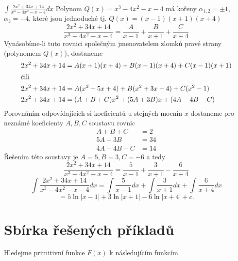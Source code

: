 {      \begin{example}
        $\displaystyle\int{\frac{2x^2+34x+14}{x^3-4x^2-x-4}}dx$ \cite[s.~90]{Knichal}\newline
        Polynom $Q(x)=x^3-4x^2-x-4$ má kořeny $\alpha_{1,2}=\pm1$, $\alpha_{3}=-4$, které jsou
        jednoduché tj. $Q(x)=(x-1)(x+1)(x+4)$ $$\frac{2x^2+34x+14}{x^3-4x^2-x-4} =
        \frac{A}{x-1}+\frac{B}{x+1}+\frac{C}{x+4}$$ Vynásobíme-li tuto rovnici společným
        jmenovatelem zlomků pravé strany (polynomem $Q(x)$), dostaneme
        \footnotesize\begin{align*}
          2x^2+34x+14 &= A(x+1)(x+4)+B(x-1)(x+4)+C(x-1)(x+1) \\
          \shortintertext{čili}
          2x^2+34x+14 &= A(x^2+5x+4)+B(x^2+3x-4)+C(x^2-1) \\
          2x^2+34x+14 &= (A+B+C)x^2+(5A+3B)x + (4A-4B-C)
        \end{align*}\small
        Porovnáním odpovídajících si koeficientů u stejných mocnin $x$  dostaneme pro nez\-ná\-mé
        koeficienty $A, B, C$ soustavu rovnic
        \begin{align*}
           A+   B + C &= 2 \\
          5A + 3B     &= 34 \\
          4A - 4B - C &= 14
        \end{align*}
        Řešením této soustavy je $A = 5, B = 3, C = -6$ a tedy
        $$\frac{2x^2+34x+14}{x^3-4x^2-x-4} = \frac{5}{x-1}+\frac{3}{x+1}-\frac{6}{x+4}$$
        \begin{equation*}
          \int{\frac{2x^2+34x+14}{x^3-4x^2-x-4}}dx 
            = \int{\frac{5}{x-1}}dx + \int{\frac{3}{x+1}}dx + \int{\frac{6}{x+4}}dx            
        \end{equation*}
        \begin{equation*}
            = 5\ln|x-1| +  3\ln|x+1| - 6\ln|x+4| +c.
        \end{equation*}
      \end{example}

  \newpage
  \section{Sbírka řešených příkladů}
    Hledejme primitivní funkce \(F(x)\) k následujícím funkcím
    

} %
\printbibliography[heading=subbibliography]
